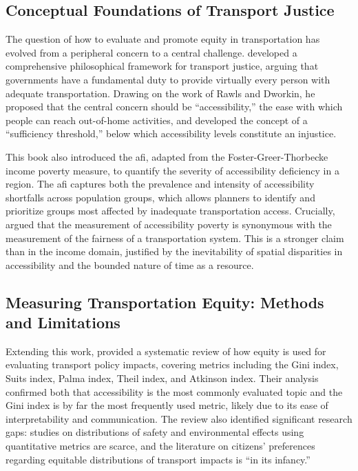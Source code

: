 \subsection{Conceptual Foundations of Transport Justice}

The question of how to evaluate and promote equity in transportation has evolved from a peripheral concern to a central challenge. \textcite{martensTransportJustice2016} developed a comprehensive philosophical framework for transport justice, arguing that governments have a fundamental duty to provide virtually every person with adequate transportation. Drawing on the work of Rawls and Dworkin, he proposed that the central concern should be ``accessibility,'' the ease with which people can reach out-of-home activities, and developed the concept of a ``sufficiency threshold,'' below which accessibility levels constitute an injustice.

This book also introduced the \gls{afi}, adapted from the Foster-Greer-Thorbecke income poverty measure, to quantify the severity of accessibility deficiency in a region. The \gls{afi} captures both the prevalence and intensity of accessibility shortfalls across population groups, which allows planners to identify and prioritize groups most affected by inadequate transportation access. Crucially, \textcite{martensTransportJustice2016} argued that the measurement of accessibility poverty is synonymous with the measurement of the fairness of a transportation system. This is a stronger claim than in the income domain, justified by the inevitability of spatial disparities in accessibility and the bounded nature of time as a resource.

\subsection{Measuring Transportation Equity: Methods and Limitations}

Extending this work, \textcite{vanweeEvaluatingTransportEquity2021} provided a systematic review of how equity is used for evaluating transport policy impacts, covering metrics including the Gini index, Suits index, Palma index, Theil index, and Atkinson index. Their analysis confirmed both that accessibility is the most commonly evaluated topic and the Gini index is by far the most frequently used metric, likely due to its ease of interpretability and communication. The review also identified significant research gaps: studies on distributions of safety and environmental effects using quantitative metrics are scarce, and the literature on citizens' preferences regarding equitable distributions of transport impacts is ``in its infancy.''

